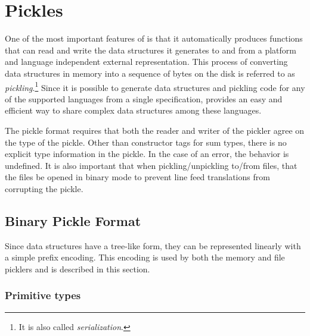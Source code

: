 %
\chapter{Pickles}
\label{chap:pickles}

One of the most important features of \asdlgen{} is that it automatically
produces functions that can read and write the data structures it generates
to and from a platform and language independent external
representation.
This process of converting data structures in memory into a
sequence of bytes on the disk is referred to as \emph{pickling}.\footnote{
  It is also called \emph{serialization}.
}
Since it is possible to generate data structures and pickling code for
any of the supported languages from a single \asdl{} specification,
\asdlgen{} provides an easy
and efficient way to share complex data structures among these languages.

The \asdl{} pickle format requires that both the reader and writer
of the pickler agree on the type of the pickle.
Other than constructor tags for sum types, there is no explicit type
information in the pickle.
In the case of an error, the behavior is undefined.
It is also important that when pickling/unpickling to/from files, that the
files be opened in binary mode to prevent line feed translations from corrupting
the pickle.

\section{Binary Pickle Format}

Since \asdl{} data structures have a tree-like form, they can be represented
linearly with a simple prefix encoding.
This encoding is used by both the memory and file picklers and
is described in this section.

\subsection{Primitive types}

